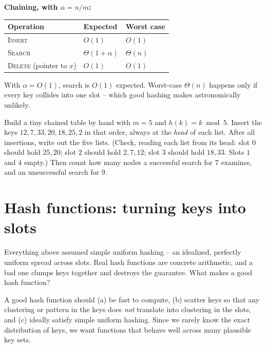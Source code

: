 \begin{complexitybox}
\textbf{Chaining, with $\alpha = n/m$:}
\begin{center}
\begin{tabular}{lll}
\toprule
Operation & Expected & Worst case \\
\midrule
\textsc{Insert} & $O(1)$ & $O(1)$ \\
\textsc{Search} & $\Theta(1+\alpha)$ & $\Theta(n)$ \\
\textsc{Delete} (pointer to $x$) & $O(1)$ & $O(1)$ \\
\bottomrule
\end{tabular}
\end{center}
With $\alpha = O(1)$, search is $O(1)$ expected. Worst-case $\Theta(n)$ happens only if every key collides into one slot -- which good hashing makes astronomically unlikely.
\end{complexitybox}

\begin{labbox}
Build a tiny chained table by hand with $m = 5$ and $h(k) = k \bmod 5$. Insert the keys $12, 7, 33, 20, 18, 25, 2$ in that order, always at the \emph{head} of each list. After all insertions, write out the five lists. (Check, reading each list from its head: slot $0$ should hold $25,20$; slot $2$ should hold $2,7,12$; slot $3$ should hold $18,33$. Slots $1$ and $4$ empty.) Then count how many nodes a successful search for $7$ examines, and an unsuccessful search for $9$.
\end{labbox}

\section{Hash functions: turning keys into slots}

Everything above assumed simple uniform hashing -- an idealized, perfectly uniform spread across slots. Real hash functions are concrete arithmetic, and a bad one clumps keys together and destroys the guarantee. What makes a good hash function?

\begin{focusbox}
A good hash function should (a) be fast to compute, (b) scatter keys so that any clustering or pattern in the keys does \emph{not} translate into clustering in the slots, and (c) ideally satisfy simple uniform hashing. Since we rarely know the exact distribution of keys, we want functions that behave well across many plausible key sets.
\end{focusbox}


